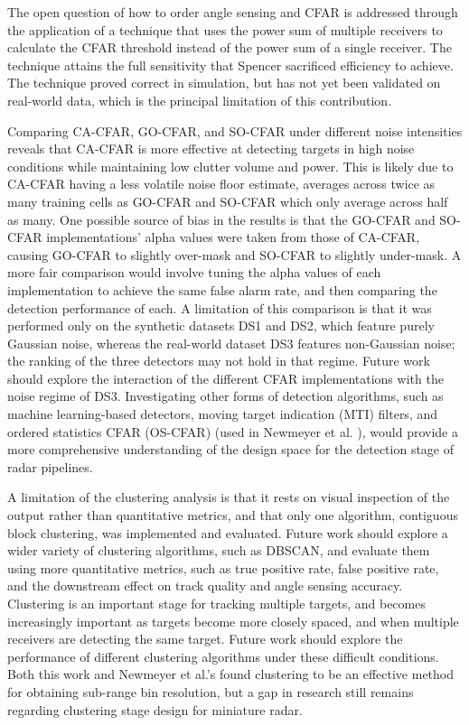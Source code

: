 The open question of how to order angle sensing and CFAR is addressed
through the application of a technique that uses the power sum of multiple receivers 
to calculate the CFAR threshold instead of the power sum of a single receiver. 
The technique attains the full sensitivity that Spencer \cite{compact_spencer_2015}
sacrificed efficiency to achieve. The technique proved correct in simulation, but 
has not yet been validated on real-world data, which is the principal limitation of this contribution.

Comparing CA-CFAR, GO-CFAR, and SO-CFAR under different noise intensities
reveals that CA-CFAR is more effective at detecting targets in high
noise conditions while maintaining low clutter volume and power. This is 
likely due to CA-CFAR having a less volatile noise floor estimate, averages 
across
twice as many training cells as GO-CFAR and SO-CFAR which only average 
across half as many. One possible source of
bias in the results is that the GO-CFAR and SO-CFAR implementations' alpha 
values were taken from those of CA-CFAR, causing GO-CFAR to slightly 
over-mask and SO-CFAR to slightly under-mask. A more fair comparison would
involve tuning the alpha values of each implementation to achieve the same
false alarm rate, and then comparing the detection performance of each. 
A limitation of this comparison is that it was performed only on the synthetic datasets 
DS1 and DS2, which feature purely Gaussian noise, whereas the real-world dataset DS3 
features non-Gaussian noise; the ranking of the three detectors may not hold in that regime.
Future work should explore the 
interaction of the different CFAR implementations with the noise regime 
of DS3. Investigating other forms of detection algorithms, such as machine learning-based
detectors, moving target indication (MTI) filters, and ordered statistics
CFAR (OS-CFAR) (used in Newmeyer et al. \cite{7577322}), would provide 
a more comprehensive understanding of the design space for the detection 
stage of radar pipelines. 

A limitation of the clustering analysis is that it rests on visual inspection of the 
output rather than quantitative metrics, and that only one algorithm, contiguous block 
clustering, was implemented and evaluated. Future work should explore a
wider variety of clustering algorithms, such as DBSCAN, and evaluate them
using more quantitative metrics, such as true positive rate, false positive 
rate, and the downstream effect on track quality and angle sensing
accuracy. Clustering is an important stage for tracking multiple targets, 
and becomes increasingly important as targets become more closely spaced,
and when multiple receivers are detecting the same target. Future work
should explore the performance of different clustering algorithms under
these difficult conditions. Both this work and Newmeyer et al.'s 
\cite{7577322} found clustering to be an effective method for obtaining
sub-range bin resolution, but a gap in research still remains regarding 
clustering stage design for miniature radar. 

